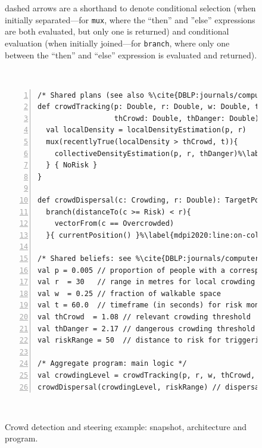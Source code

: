 \begin{figure}
\begin{minipage}{0.62\textwidth}
{{dashed arrows are a shorthand to denote conditional selection (when initially separated---for \lstinline|mux|, where the ``then'' and ''else'' expressions are both evaluated, but only one is returned) and conditional evaluation (when initially joined---for \lstinline|branch|, where only one between the ``then'' and  ``else'' expression is evaluated and returned).}
}
\end{minipage}\\[0.4cm]
\begin{minipage}{\textwidth}
\begin{lstlisting}[escapechar=\%,numbers=left]
/* Shared plans (see also %\cite{DBLP:journals/computer/BealPV15}%) */
def crowdTracking(p: Double, r: Double, w: Double, t: Double, %\label{mdpi2020:line:crowdtrack}%
                  thCrowd: Double, thDanger: Double): Crowding = {
  val localDensity = localDensityEstimation(p, r)
  mux(recentlyTrue(localDensity > thCrowd, t)){
    collectiveDensityEstimation(p, r, thDanger)%\label{mdpi2020:line:colldens}%
  } { NoRisk }
}

def crowdDispersal(c: Crowding, r: Double): TargetPosition = %\label{mdpi2020:line:dispersal}%
  branch(distanceTo(c >= Risk) < r){ 
    vectorFrom(c == Overcrowded) 
  }{ currentPosition() }%\label{mdpi2020:line:on-collective-intention}%

/* Shared beliefs: see %\cite{DBLP:journals/computer/BealPV15}% for motivation of the specific values */
val p = 0.005 // proportion of people with a corresponding device (agent)
val r  = 30   // range in metres for local crowding estimation
val w  = 0.25 // fraction of walkable space
val t = 60.0  // timeframe (in seconds) for risk monitoring
val thCrowd  = 1.08 // relevant crowding threshold
val thDanger = 2.17 // dangerous crowding threshold
val riskRange = 50  // distance to risk for triggering alert

/* Aggregate program: main logic */
val crowdingLevel = crowdTracking(p, r, w, thCrowd, thDanger, t)
crowdDispersal(crowdingLevel, riskRange) // dispersal advice
\end{lstlisting}

\end{minipage}\\[0.2cm]
\caption{Crowd detection and steering example: snapshot, architecture and program.}
\label{mdpi2020:fig:crowd-example}
\end{figure}

